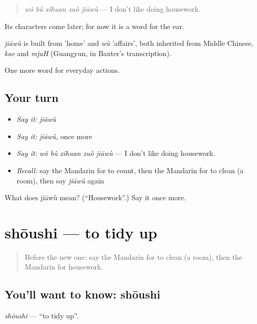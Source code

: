 \begin{quote}
\emph{wǒ bù xǐhuan zuò jiāwù} — I don't like doing housework.
\end{quote}

Its characters come later; for now it is a word for the ear.

\begin{cousinweb}
\emph{jiāwù} is built from  'home' and \emph{wù} 'affairs', both inherited from Middle Chinese, \emph{kae} and \emph{mjuH} (Guangyun, in Baxter's transcription).
\end{cousinweb}

\begin{grammarlens}[title={What you've built}]
One more word for everyday actions.
\end{grammarlens}

\subsection*{Your turn}
\begin{itemize}
\raggedright
  \item \emph{Say it:} \emph{jiāwù}
  \item \emph{Say it:} \emph{jiāwù}, once more
  \item \emph{Say it:} \emph{wǒ bù xǐhuan zuò jiāwù} — I don't like doing housework.
  \item \emph{Recall:} say the Mandarin for to count, then the Mandarin for to clean (a room), then say \emph{jiāwù} again
\end{itemize}

\begin{tcolorbox}[breakable,colback=teal!4,colframe=teal!35!black,title={Before you move on}]
What does jiāwù mean? (\textquotedblleft{}Housework\textquotedblright{}.) Say it once more.
\end{tcolorbox}
\section[shōushi]{shōushi — to tidy up}

\label{lesson:ZH-C133-shoushi}



\begin{quote}
Before the new one: say the Mandarin for to clean (a room), then the Mandarin for housework.
\end{quote}

\subsection*{You'll want to know: shōushi}
\emph{shōushi} — \textquotedblleft{}to tidy up\textquotedblright{}.

